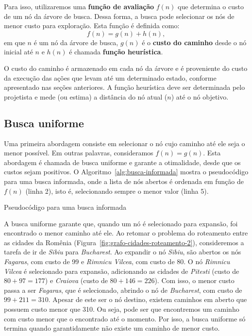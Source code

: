 Para isso, utilizaremos uma \textbf{função de avaliação} $f(n)$ que determina o custo de um nó da árvore de busca. Dessa forma, a busca pode selecionar os nós de menor custo para exploração. Esta função é definida como:
$$
f(n) = g(n) + h(n),
$$
em que $n$ é um nó da árvore de busca, $g(n)$ é o \textbf{custo do caminho} desde o nó inicial até $n$ e $h(n)$ é chamada \textbf{função heurística}.

O custo do caminho é armazenado em cada nó da árvore e é proveniente do custo da execução das ações que levam até um determinado estado, conforme apresentado nas seções anteriores. A função heurística deve ser determinada pelo projetista e mede (ou estima) a distância do nó atual ($n$) até o nó objetivo.

\subsection{Busca uniforme}

Uma primeira abordagem consiste em selecionar o nó cujo caminho até ele seja o menor possível. Em outras palavras, consideramos $f(n) = g(n)$. Esta abordagem é chamada de busca uniforme e garante a otimalidade, desde que os custos sejam positivos. O Algoritmo~\ref{alg:busca-informada} mostra o pseudocódigo para uma busca informada, onde a lista de nós abertos é ordenada em função de $f(n)$ (linha 2), isto é, selecionando sempre o menor valor (linha 5).

\begin{algorithm}[h]
	\DontPrintSemicolon
	
	
	\caption{Pseudocódigo para uma busca informada}
	\label{alg:busca-informada}
\end{algorithm}

A busca uniforme garante que, quando um nó é selecionado para expansão, foi encontrado o menor caminho até ele. Ao retomar o problema do roteamento entre as cidades da Romênia (Figura~\ref{fig:grafo-cidades-roteamento-2}), consideremos a tarefa de ir de \textit{Sibiu} para \textit{Bucharest}. Ao expandir o nó \textit{Sibiu}, são abertos os nós \textit{Fagaras}, com custo de 99 e \textit{Rimnicu Vilcea}, com custo de 80. O nó \textit{Rimnicu Vilcea} é selecionado para expansão, adicionando as cidades de \textit{Pitesti} (custo de $80 + 97 = 177$) e \textit{Craiova} (custo de $80 + 146 = 226$). Com isso, o menor custo passa a ser \textit{Fagaras}, que é selecionado, abrindo o nó de \textit{Bucharest}, com custo de $99 + 211 = 310$. Apesar de este ser o nó destino, existem caminhos em aberto que possuem custo menor que 310. Ou seja, pode ser que encontremos um caminho com custo menor que o encontrado até o momento. Por isso, a busca uniforme só termina quando garantidamente não existe um caminho de menor custo.

